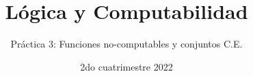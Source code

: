 

\title{Lógica y Computabilidad}
\author{Práctica 3: Funciones no-computables y conjuntos C.E.}
\date{2do cuatrimestre 2022}



\maketitle




